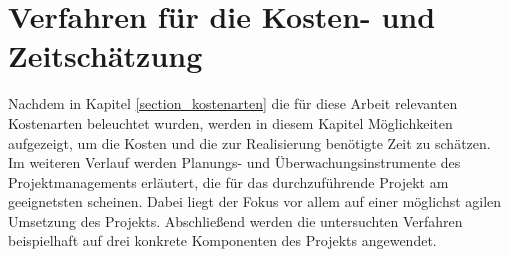 \section{Verfahren für die Kosten- und Zeitschätzung}
\label{section_verfahren_schaetzung}
Nachdem in Kapitel \ref{section_kostenarten} die für diese Arbeit relevanten Kostenarten beleuchtet wurden, werden in diesem Kapitel Möglichkeiten aufgezeigt, um die Kosten und die zur Realisierung benötigte Zeit zu schätzen. Im weiteren Verlauf werden Planungs- und Überwachungsinstrumente des Projektmanagements erläutert, die für das durchzuführende Projekt am geeignetsten scheinen. Dabei liegt der Fokus vor allem auf einer möglichst agilen Umsetzung des Projekts. Abschließend werden die untersuchten Verfahren beispielhaft auf drei konkrete Komponenten des Projekts angewendet.




